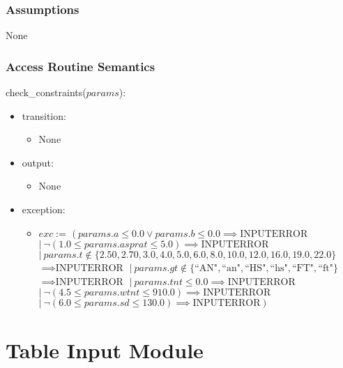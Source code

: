\documentclass[12pt,fleqn]{article}
\begin{document}
\subsubsection* {Assumptions}
None

\subsubsection* {Access Routine Semantics}

check\_constraints($params$):
\begin{itemize}
\item transition: \begin{itemize}
                        \item[] None
                        \end{itemize}
\item output: \begin{itemize}
                    \item[] None
                    \end{itemize}
\newpage
\item exception: \begin{itemize}
                        \item[] $exc := $ \tabto{1.4cm} $ (~params.a \leq 0.0 \vee params.b \leq 0.0 \implies \textrm{INPUTERROR}$
                                             \tabto{1.4cm} $ |~\neg (1.0 \leq params.asprat \leq 5.0) \implies \textrm{INPUTERROR}$ 
                                             \tabto{1.4cm} $ |~params.t \notin \{ 2.50, 2.70, 3.0, 4.0, 5.0, 6.0, 8.0, 10.0, 12.0, 16.0, 19.0, 22.0 \} $
                                             \tabto{1.9cm} $\implies \textrm{INPUTERROR}$
                                             \tabto{1.4cm} $ |~params.gt \notin \{ \textrm{``AN"}, \textrm{``an"}, \textrm{``HS"}, \textrm{``hs"}, \textrm{``FT"}, \textrm{``ft"} \} $ \tabto{1.9cm} $\implies \textrm{INPUTERROR}$
                                             \tabto{1.4cm} $ |~params.tnt \leq 0.0 \implies \textrm{INPUTERROR}$
                                             \tabto{1.4cm} $ |~\neg(4.5 \leq params.wtnt \leq 910.0) \implies \textrm{INPUTERROR}$
                                             \tabto{1.4cm} $ |~\neg(6.0 \leq params.sd \leq 130.0) \implies \textrm{INPUTERROR}~)$
                        \end{itemize}
\end{itemize}

\newpage

\section* {Table Input Module}
\end{document}
